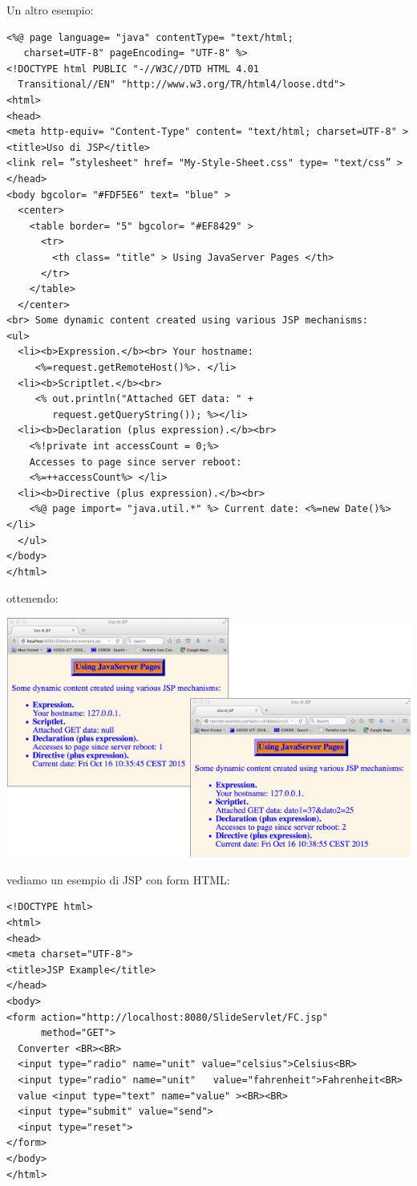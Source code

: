 \documentclass[a4paper,12pt, oneside]{book}
\begin{document}
Un altro esempio:
\begin{verbatim}
<%@ page language= "java" contentType= "text/html;
   charset=UTF-8" pageEncoding= "UTF-8" %>
<!DOCTYPE html PUBLIC "-//W3C//DTD HTML 4.01 
  Transitional//EN" "http://www.w3.org/TR/html4/loose.dtd">
<html>
<head>
<meta http-equiv= "Content-Type" content= "text/html; charset=UTF-8" >
<title>Uso di JSP</title>
<link rel= ”stylesheet" href= "My-Style-Sheet.css" type= "text/css” >
</head>
<body bgcolor= "#FDF5E6" text= "blue" >
  <center>
    <table border= "5" bgcolor= "#EF8429" >
      <tr>
        <th class= "title" > Using JavaServer Pages </th>
      </tr>
    </table>
  </center>
<br> Some dynamic content created using various JSP mechanisms:
<ul>
  <li><b>Expression.</b><br> Your hostname:
     <%=request.getRemoteHost()%>. </li>
  <li><b>Scriptlet.</b><br>
     <% out.println("Attached GET data: " +
        request.getQueryString()); %></li>
  <li><b>Declaration (plus expression).</b><br> 
    <%!private int accessCount = 0;%>
    Accesses to page since server reboot: 
    <%=++accessCount%> </li>
  <li><b>Directive (plus expression).</b><br>
    <%@ page import= "java.util.*" %> Current date: <%=new Date()%> </li>
  </ul>
</body>
</html> 
\end{verbatim}
ottenendo:
\begin{center}
	\includegraphics[scale=0.7]{img/jsp2.png}
\end{center}
vediamo un esempio di JSP con form HTML:
\begin{verbatim}
<!DOCTYPE html>
<html>
<head>
<meta charset="UTF-8">
<title>JSP Example</title>
</head>
<body>
<form action="http://localhost:8080/SlideServlet/FC.jsp"
      method="GET"> 
  Converter <BR><BR>
  <input type="radio" name="unit" value="celsius">Celsius<BR>
  <input type="radio" name="unit"   value="fahrenheit">Fahrenheit<BR>
  value <input type="text" name="value" ><BR><BR>
  <input type="submit" value="send">
  <input type="reset">
</form>
</body>
</html>
\end{verbatim}
\end{document}
